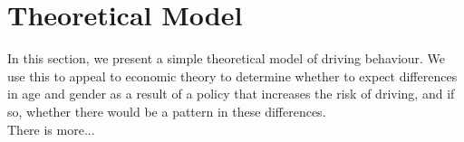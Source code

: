 \section{Theoretical Model}
\label{sec:Model}

In this section, we present a simple theoretical model of driving behaviour. We use this to appeal to economic theory to determine whether to expect differences in age and gender as a result of a policy that increases the risk of driving, and if so, whether there would be a pattern in these differences. \\

{\Large There is more...} \\

